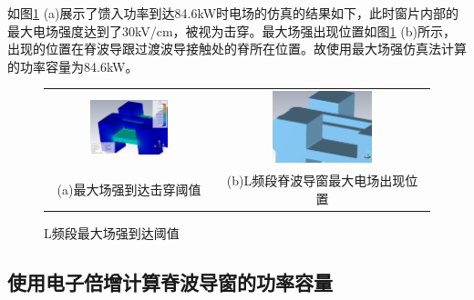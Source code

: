 \documentclass[master]{thesis-uestc}
\begin{document}
如图\ref{fig:L频段最大场强到达阈值} (a)展示了馈入功率到达84.6kW时电场的仿真的结果如下，此时窗片内部的最大电场强度达到了30kV/cm，被视为击穿。最大场强出现位置如图\ref{fig:L频段最大场强到达阈值} (b)所示，出现的位置在脊波导跟过渡波导接触处的脊所在位置。故使用最大场强仿真法计算的功率容量为84.6kW。
\begin{figure}[!htb]
    \small
    \centering
    \begin{tabular}{@{\ }c@{\ }c}
        \includegraphics[width=0.49\textwidth]{pic/chapter4/L频段最大场强到达阈值.png} & 
        \hspace{5pt}
        \includegraphics[width=0.49\textwidth]{pic/chapter4/L频段最大场强所在位置.png}     \\
        \mbox{\small (a)最大场强到达击穿阈值}                                                                               & 
        \mbox{\small (b)L频段脊波导窗最大电场出现位置}                                                                                  \\
    \end{tabular}
    \caption{L频段最大场强到达阈值}
    \label{fig:L频段最大场强到达阈值}
\end{figure}


\subsection{使用电子倍增计算脊波导窗的功率容量}
\end{document}
